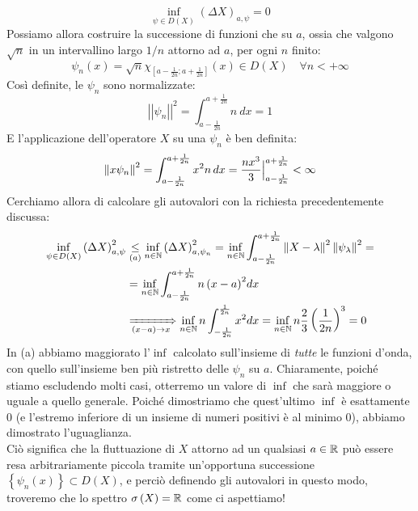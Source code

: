 \documentclass[../../FisicaTeorica.tex]{subfiles}
\begin{document}
\[
\inf_{\psi\in D\left(X\right)}{\left(\Delta X\right)_{a,\psi}}=0
\]
Possiamo allora costruire la successione di funzioni che  su $a$, ossia che valgono $\sqrt{n}$ in un intervallino largo $1/n$ attorno ad $a$, per ogni $n$ finito:
\[
\psi_n\left(x\right)=\sqrt n \chi_{\left[a-\frac{1}{2n};a+\frac{1}{2n}\right]}\left(x\right)\in D\left(X\right) \quad \forall n < +\infty
\]
Così definite, le $\psi_n$ sono normalizzate:
\[
\left|\left|\psi_n\right|\right|^2= \int_{a-\frac{1}{2n}}^{a+\frac{1}{2n}}{n\ dx}=1
\]
E l'applicazione dell'operatore $X$ su una $\psi_n$ è ben definita:
\[
\left\lVert x\psi_n\right\rVert^2 = \int_{a-\frac{1}{2n}}^{a+\frac{1}{2n}} x^2 n\,dx = \frac{nx^3}{3}\Big |^{a+\frac{1}{2n}}_{a-\frac{1}{2n}} < \infty
\]
Cerchiamo allora di calcolare gli autovalori con la richiesta  precedentemente discussa:
\begin{align*}
\inf_{\psi\in D\left(X\right)}{\left(\Delta X\right)_{a,\psi}^2}&\underset{(a)}{\leq} \inf_{n\in \mathbb{N}}{\left(\Delta X\right)_{a,\psi_n}^2}=
\inf_{n\in\mathbb{N}}\int_{a-\frac{1}{2n}}^{a+\frac{1}{2n}} \left\lVert X-\lambda\right\rVert^2 \left\lVert\psi_\lambda\right\rVert^2 = \\
&= \inf_{n\in\mathbb{N}}{\int_{a-\frac{1}{2n}}^{a+\frac{1}{2n}}{{n\left(x-a\right)}^2dx}} \\
&\xRightarrow[(x-a)\to x]{} \inf_{n\in\mathbb{N}}{n\int_{-\frac{1}{2n}}^{\frac{1}{2n}}{x^2dx}=\inf_{n\in\mathbb{N}}{n\frac{2}{3}\left(\frac{1}{2n}\right)^3}}=0
\end{align*}
In (a) abbiamo maggiorato l'$\inf$ calcolato sull'insieme di \textit{tutte} le funzioni d'onda, con quello sull'insieme ben più ristretto delle $\psi_n$  su $a$. Chiaramente, poiché stiamo escludendo molti casi, otterremo un valore di $\inf$ che sarà maggiore o uguale a quello generale. Poiché dimostriamo che quest'ultimo $\inf$ è esattamente $0$ (e l'estremo inferiore di un insieme di numeri positivi è al minimo $0$), abbiamo dimostrato l'uguaglianza.\\
Ciò significa che la fluttuazione di $X$ attorno ad un qualsiasi $a\in \mathbb{R}$ può essere resa arbitrariamente piccola tramite un'opportuna successione $\left\{\psi_n(x)\right\}\subset D\left(X\right)$, e perciò definendo gli autovalori in questo modo, troveremo che lo spettro $\sigma \left(X\right)=\mathbb{R}$ come ci aspettiamo!\\
\end{document}
